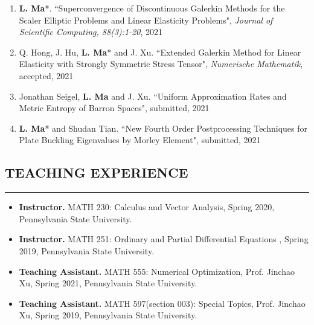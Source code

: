 \documentclass[10pt,a4]{article}
\begin{document}
\begin{small}
\begin{enumerate}
	\item \textbf{L. Ma}*. ``Superconvergence of Discontinuous Galerkin Methods for the Scaler Elliptic Problems and Linear Elasticity Problems", {\it Journal of Scientific Computing, 88(3):1-20}, 2021

	\item Q. Hong, J. Hu, \textbf{L. Ma}* and J. Xu. ``Extended Galerkin Method for Linear Elasticity with Strongly Symmetric Stress Tensor",  {\it Numerische Mathematik}, accepted, 2021
	
	\item Jonathan Seigel, \textbf{L. Ma} and J. Xu. ``Uniform Approximation Rates and Metric Entropy of Barron Spaces", submitted, 2021
	
	\item \textbf{L. Ma}* and Shudan Tian. ``New Fourth Order Postprocessing Techniques for Plate Buckling Eigenvalues by Morley Element", submitted, 2021%
	
%	
    
\end{enumerate}

\subsection*{TEACHING EXPERIENCE}
\hrule
\vspace{0.2cm}

\begin{itemize}

\item {\bf Instructor.} MATH 230:  Calculus and Vector Analysis, Spring 2020, Pennsylvania State University. 

\item {\bf Instructor.} MATH 251: Ordinary and Partial Differential Equations , Spring 2019, Pennsylvania State University.

\item {\bf Teaching Assistant.} MATH 555: Numerical Optimization, Prof. Jinchao Xu, Spring 2021, Pennsylvania State University.

\item {\bf Teaching Assistant.} MATH 597(section 003): Special Topics, Prof. Jinchao Xu, Spring 2019, Pennsylvania State University.


\end{itemize}
\end{small}
\end{document}
